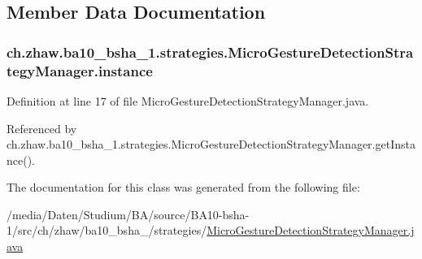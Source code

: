 \subsection{Member Data Documentation}
\hypertarget{classch_1_1zhaw_1_1ba10__bsha__1_1_1strategies_1_1MicroGestureDetectionStrategyManager_aad9a400795f90d61a23575fc4e0be2a0}{
\subsubsection[{instance}]{ {\bf ch.zhaw.ba10\_\-bsha\_\-1.strategies.MicroGestureDetectionStrategyManager.instance}}}
\label{classch_1_1zhaw_1_1ba10__bsha__1_1_1strategies_1_1MicroGestureDetectionStrategyManager_aad9a400795f90d61a23575fc4e0be2a0}


Definition at line 17 of file MicroGestureDetectionStrategyManager.java.

Referenced by ch.zhaw.ba10\_\-bsha\_\-1.strategies.MicroGestureDetectionStrategyManager.getInstance().

The documentation for this class was generated from the following file:\begin{DoxyCompactItemize}
\item 
/media/Daten/Studium/BA/source/BA10-\/bsha-\/1/src/ch/zhaw/ba10\_\-bsha\_/strategies/\hyperlink{MicroGestureDetectionStrategyManager_8java}{MicroGestureDetectionStrategyManager.java}\end{DoxyCompactItemize}
